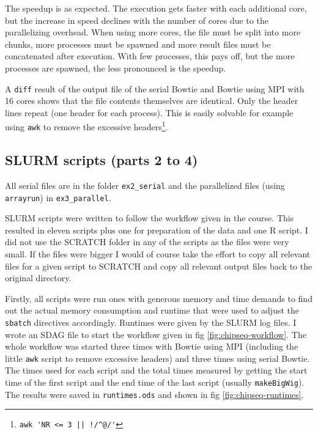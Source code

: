 \documentclass[paper=a4, 12pt]{scrartcl}
\begin{document}
The speedup is as expected. The execution gets faster with each additional core, but the increase in speed declines with the number of cores due to the parallelizing overhead. When using more cores, the file must be split into more chunks, more processes must be spawned and more result files must be concatenated after execution. With few processes, this pays off, but the more processes are spawned, the less pronounced is the speedup.

A \texttt{diff} result of the output file of the serial Bowtie and Bowtie using MPI with 16 cores shows that the file contents themselves are identical. Only the header lines repeat (one header for each process). This is easily solvable for example using \texttt{awk} to remove the excessive headers\footnote{\verb&awk 'NR <= 3 || !/^@/'&}.

\subsection{SLURM scripts (parts 2 to 4)}

All serial files are in the folder \texttt{ex2\_serial} and the parallelized files (using \texttt{arrayrun}) in \texttt{ex3\_parallel}.

SLURM scripts were written to follow the workflow given in the course. This resulted in eleven scripts plus one for preparation of the data and one R script. I did not use the SCRATCH folder in any of the scripts as the files were very small. If the files were bigger I would of course take the effort to copy all relevant files for a given script to SCRATCH and copy all relevant output files back to the original directory.

Firstly, all scripts were run ones with generous memory and time demands to find out the actual memory consumption and runtime that were used to adjust the \texttt{sbatch} directives accordingly. Runtimes were given by the SLURM log files. I wrote an SDAG file to start the workflow given in fig \ref{fig:chipseq-workflow}. The whole workflow was started three times with Bowtie using MPI (including the little \texttt{awk} script to remove excessive headers) and three times using serial Bowtie. The times used for each script and the total times measured by getting the start time of the first script and the end time of the last script (usually \texttt{makeBigWig}). The results were saved in \texttt{runtimes.ods} and shown in fig \ref{fig:chipseq-runtimes}.
\end{document}
